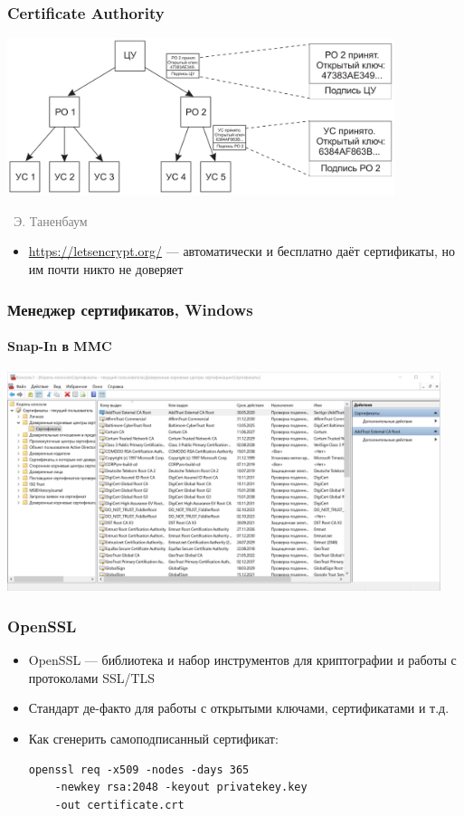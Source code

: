\documentclass[xetex,mathserif,serif]{beamer}
\newcommand{\attribution}[1] {
\vspace{-5mm}\begin{flushright}\begin{scriptsize}\textcolor{gray}{\textcopyright\, #1}\end{scriptsize}\end{flushright}
}
\begin{document}
	\begin{frame}
		\frametitle{Certificate Authority}
		\begin{center}
			\includegraphics[width=0.85\textwidth]{certHierarchy.png}
			\attribution{Э. Таненбаум}
		\end{center}
		\begin{itemize}
			\item \url{https://letsencrypt.org/} --- автоматически и бесплатно даёт сертификаты, но им почти никто не доверяет
		\end{itemize}
	\end{frame}

	\begin{frame}
		\frametitle{Менеджер сертификатов, Windows}
		\framesubtitle{Snap-In в MMC}
		\begin{center}
			\includegraphics[width=0.95\textwidth]{windowsCertManager.png}
		\end{center}
	\end{frame}

	\begin{frame}[fragile]
		\frametitle{OpenSSL}
		\begin{itemize}
			\item OpenSSL --- библиотека и набор инструментов для криптографии и работы с протоколами SSL/TLS
			\item Стандарт де-факто для работы с открытыми ключами, сертификатами и т.д.
			\item Как сгенерить самоподписанный сертификат:
			
				\begin{verbatim}
openssl req -x509 -nodes -days 365 
    -newkey rsa:2048 -keyout privatekey.key 
    -out certificate.crt
				\end{verbatim}
		\end{itemize}
	\end{frame}
\end{document}
